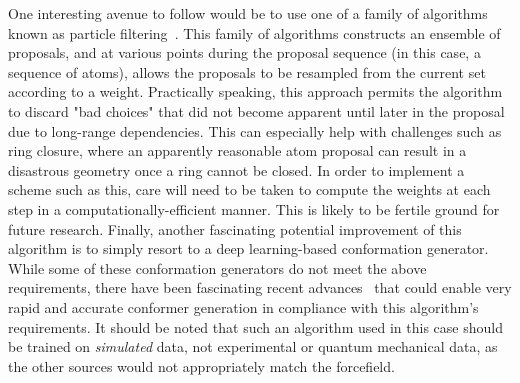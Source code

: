 %
One interesting avenue to follow would be to use one of a family of algorithms known as particle filtering~\cite{Andrieu2010pmcmc, COMBE2003}.
%
This family of algorithms constructs an ensemble of proposals, and at various points during the proposal sequence (in this case, a sequence of atoms), allows the proposals to be resampled from the current set according to a weight.
%
Practically speaking, this approach permits the algorithm to discard "bad choices" that did not become apparent until later in the proposal due to long-range dependencies.
%
This can especially help with challenges such as ring closure, where an apparently reasonable atom proposal can result in a disastrous geometry once a ring cannot be closed.
%
In order to implement a scheme such as this, care will need to be taken to compute the weights at each step in a computationally-efficient manner.
%
This is likely to be fertile ground for future research.
%
Finally, another fascinating potential improvement of this algorithm is to simply resort to a deep learning-based conformation generator.
%
While some of these conformation generators do not meet the above requirements, there have been fascinating recent advances~\cite{schutt2018} that could enable very rapid and accurate conformer generation in compliance with this algorithm's requirements.
%
It should be noted that such an algorithm used in this case should be trained on \emph{simulated} data, not experimental or quantum mechanical data, as the other sources would not appropriately match the forcefield.
%
